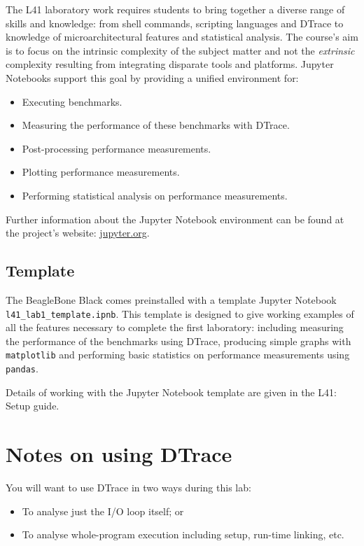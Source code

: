 \documentclass[a4paper,10pt]{article}
\begin{document}
The L41 laboratory work requires students to bring together a diverse
range of skills and knowledge: from shell commands, scripting languages and
DTrace to knowledge of microarchitectural features and statistical analysis. The
course's aim is to focus on the intrinsic complexity of the subject matter and
not the \textit{extrinsic} complexity resulting from integrating disparate
tools and platforms. Jupyter Notebooks support this goal by providing a unified
environment for:

\begin{itemize}
\item Executing benchmarks.
\item Measuring the performance of these benchmarks with DTrace.
\item Post-processing performance measurements.
\item Plotting performance measurements.
\item Performing statistical analysis on performance measurements. 
\end{itemize}


Further information about the Jupyter Notebook environment can be found at the
project's website: \url{jupyter.org}.

\subsection*{Template}

The BeagleBone Black comes preinstalled with a template Jupyter Notebook
\texttt{l41\_lab1\_template.ipnb}. This template is designed to give working
examples of all the features necessary to complete the first laboratory:
including measuring the performance of the benchmarks using DTrace, producing
simple graphs with \texttt{matplotlib} and performing basic statistics on
performance measurements using \texttt{pandas}. 

Details of working with the Jupyter Notebook template are given in the
L41: Setup guide.

\section*{Notes on using DTrace}

You will want to use DTrace in two ways during this lab:

\begin{itemize}
\item To analyse just the I/O loop itself; or
\item To analyse whole-program execution including setup, run-time linking,
  etc.
\end{itemize}
\end{document}
